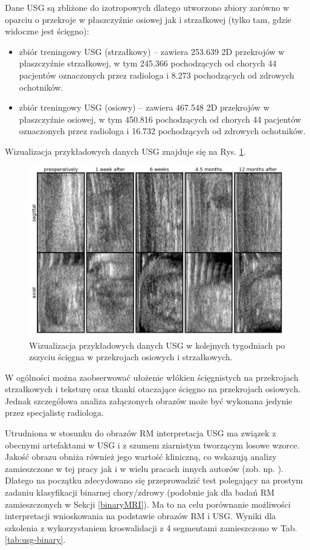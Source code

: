Dane USG są zbliżone do izotropowych dlatego utworzono zbiory zarówno w oparciu o przekroje w płaszczyźnie osiowej jak i strzałkowej (tylko tam, gdzie widoczne jest ścięgno):
\begin{itemize}
	\item zbiór treningowy USG (strzałkowy) -- zawiera 253.639 2D przekrojów w płaszczyźnie strzałkowej, w tym 245.366 pochodzących od chorych 44 pacjentów oznaczonych przez radiologa i 8.273 pochodzących od zdrowych ochotników.
	\item zbiór treningowy USG (osiowy) -- zawiera 467.548 2D przekrojów w płaszczyźnie osiowej, w tym 450.816 pochodzących od chorych 44 pacjentów oznaczonych przez radiologa i 16.732 pochodzących od zdrowych ochotników. 
\end{itemize}

Wizualizacja przykładowych danych USG znajduje się na Rys. \ref{fig:US_sample}.
\begin{figure}[h!]
	\includegraphics[width=\textwidth]{figures/Data_US_sample.png}
	\caption{Wizualizacja przykładowych danych USG w kolejnych tygodniach po zszyciu ścięgna w przekrojach osiowych i strzałkowych.}
	\label{fig:US_sample}
\end{figure}
W ogólności można zaobserwować ułożenie włókien ścięgnistych na przekrojach strzałkowych i teksturę oraz tkanki otaczające ścięgno na przekrojach osiowych. Jednak szczegółowa analiza załączonych obrazów może być wykonana jedynie przez specjalistę radiologa. 

Utrudniona w stosunku do obrazów RM interpretacja USG ma związek z obecnymi artefaktami w USG i z szumem ziarnistym tworzącym losowe wzorce. Jakość obrazu obniża również jego wartość kliniczną, co wskazują analizy zamieszczone w tej pracy jak i w wielu pracach innych autorów (zob. np. \cite{Khan2003, Ibrahim2013}). Dlatego na początku zdecydowano się przeprowadzić test polegający na prostym zadaniu klasyfikacji binarnej chory/zdrowy (podobnie jak dla badań RM zamieszczonych w Sekcji \ref{binaryMRI}). Ma to na celu porównanie możliwości interpretacji wnioskowania na podstawie obrazów RM i USG. Wyniki dla szkolenia z wykorzystaniem kroswalidacji z 4 segmentami zamieszczono w Tab. \ref{tab:usg-binary}.

